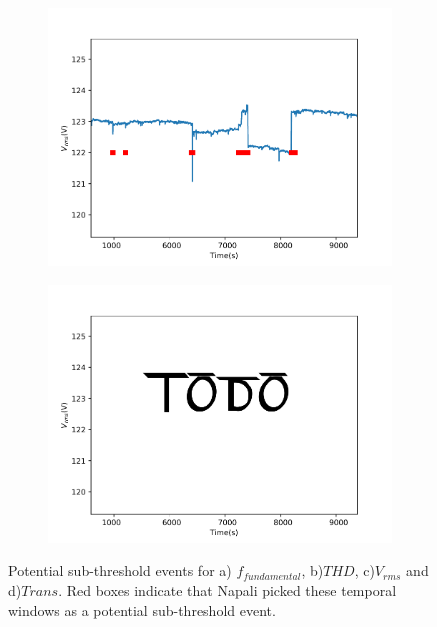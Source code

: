 \begin{figure}[h]
    \begin{subfigure}{0.5\textwidth}
        \centering
        \includegraphics[width=1\linewidth]{img/napali_eval/napali_live_rms.pdf}
        \caption{}
        \label{fig:expdes:7:3}
    \end{subfigure}%
    \begin{subfigure}{0.5\textwidth}
        \centering
        \includegraphics[width=1\linewidth]{img/napali_eval/napali_live_trans.pdf}
        \caption{}
        \label{fig:expdes:7:4}
    \end{subfigure}

    \caption{Potential sub-threshold events for a) $f_{fundamental}$, b)$THD$, c)$V_{rms}$ and d)$Trans$.
    Red boxes indicate that Napali picked these temporal windows as a potential sub-threshold event.}
    \label{fig:expdes:7}
\end{figure}


